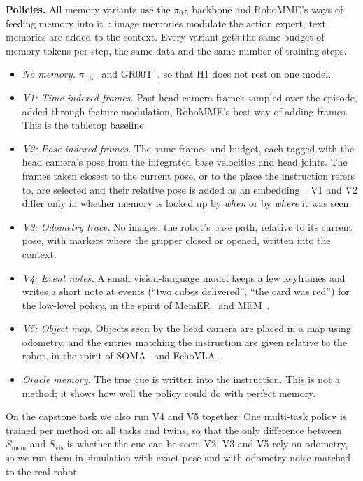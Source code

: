 \documentclass[conference]{IEEEtran}
\newcommand{\Smem}{S_{\mathrm{mem}}}
\newcommand{\Svis}{S_{\mathrm{vis}}}
\newcommand{\pizf}{$\pi_{0.5}$}
\begin{document}
\textbf{Policies.} All memory variants use the \pizf{} backbone and RoboMME's ways of feeding memory into it~\cite{dai2026robomme}: image memories modulate the action expert, text memories are added to the context. Every variant gets the same budget of memory tokens per step, the same data and the same number of training steps.
\begin{itemize}
\item \emph{No memory.} \pizf{}~\cite{black2025pi05} and GR00T~\cite{bjorck2025gr00t}, so that H1 does not rest on one model.
\item \emph{V1: Time-indexed frames.} Past head-camera frames sampled over the episode, added through feature modulation, RoboMME's best way of adding frames. This is the tabletop baseline.
\item \emph{V2: Pose-indexed frames.} The same frames and budget, each tagged with the head camera's pose from the integrated base velocities and head joints. The frames taken closest to the current pose, or to the place the instruction refers to, are selected and their relative pose is added as an embedding~\cite{fang2019smt,anwar2024remembr}. V1 and V2 differ only in whether memory is looked up by \emph{when} or by \emph{where} it was seen.
\item \emph{V3: Odometry trace.} No images: the robot's base path, relative to its current pose, with markers where the gripper closed or opened, written into the context.
\item \emph{V4: Event notes.} A small vision-language model keeps a few keyframes and writes a short note at events (``two cubes delivered'', ``the card was red'') for the low-level policy, in the spirit of MemER~\cite{sridhar2026memer} and MEM~\cite{torne2026mem}.
\item \emph{V5: Object map.} Objects seen by the head camera are placed in a map using odometry, and the entries matching the instruction are given relative to the robot, in the spirit of SOMA~\cite{li2026soma} and EchoVLA~\cite{lin2025echovla}.
\item \emph{Oracle memory.} The true cue is written into the instruction. This is not a method; it shows how well the policy could do with perfect memory.
\end{itemize}
On the capstone task we also run V4 and V5 together. One multi-task policy is trained per method on all tasks and twins, so that the only difference between $\Smem$ and $\Svis$ is whether the cue can be seen. V2, V3 and V5 rely on odometry, so we run them in simulation with exact pose and with odometry noise matched to the real robot.
\end{document}
